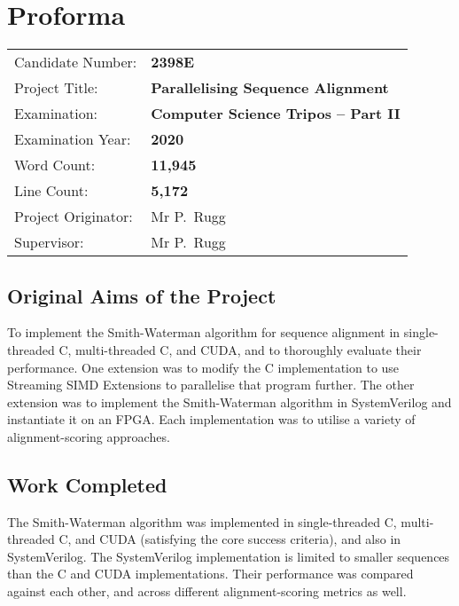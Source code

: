 \documentclass[12pt,notitlepage]{report}
\newcommand{\candidate}{2398E}
\begin{document}
\chapter*{Proforma}

{\large
\begin{tabular}{ll}
Candidate Number:   & \bf \candidate                              \\
Project Title:      & \bf Parallelising Sequence Alignment        \\
Examination:        & \bf Computer Science Tripos -- Part II      \\
Examination Year:   & \bf 2020                                    \\
Word Count:         & \bf 11,945\footnotemark[1]                    \\
Line Count:         & \bf 5,172\footnotemark[2]                    \\
Project Originator: & Mr P.~Rugg                    \\
Supervisor:         & Mr P.~Rugg                    \\
\end{tabular}
}


\section*{Original Aims of the Project}

To implement the Smith-Waterman algorithm for sequence alignment in single-threaded C, multi-threaded C, and CUDA, and to thoroughly evaluate their performance.
One extension was to modify the C implementation to use Streaming SIMD Extensions to parallelise that program further.
The other extension was to implement the Smith-Waterman algorithm in SystemVerilog and instantiate it on an FPGA.
Each implementation was to utilise a variety of alignment-scoring approaches.

\section*{Work Completed}

The Smith-Waterman algorithm was implemented in single-threaded C, multi-threaded C, and CUDA (satisfying the core success criteria), and also in SystemVerilog.
The SystemVerilog implementation is limited to smaller sequences than the C and CUDA implementations.
Their performance was compared against each other, and across different alignment-scoring metrics as well.
\end{document}
